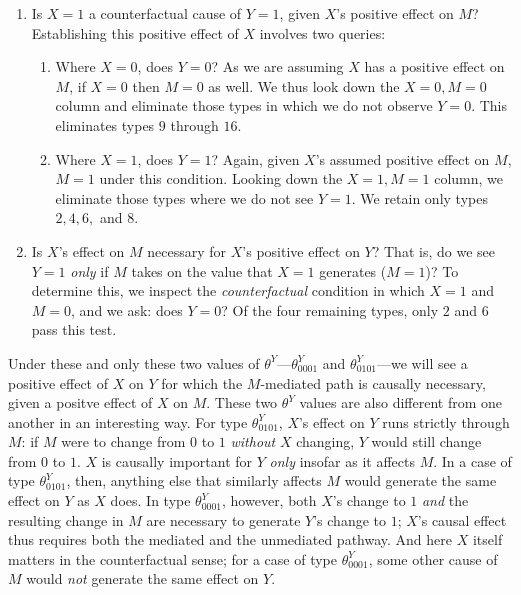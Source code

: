 \documentclass[
  12pt,
]{book}
\begin{document}
\begin{enumerate}
\def\labelenumi{\arabic{enumi}.}
\item
  Is \(X=1\) a counterfactual cause of \(Y=1\), given \(X\)'s positive effect on \(M\)? Establishing this positive effect of \(X\) involves two queries:

  \begin{enumerate}
  \def\labelenumii{\alph{enumii})}
  \item
    Where \(X=0\), does \(Y=0\)? As we are assuming \(X\) has a positive effect on \(M\), if \(X=0\) then \(M=0\) as well. We thus look down the \(X=0, M=0\) column and eliminate those types in which we do not observe \(Y=0\). This eliminates types \(9\) through \(16\).
  \item
    Where \(X=1\), does \(Y=1\)? Again, given \(X\)'s assumed positive effect on \(M\), \(M=1\) under this condition. Looking down the \(X=1, M=1\) column, we eliminate those types where we do not see \(Y=1\). We retain only types \(2, 4, 6,\) and \(8\).
  \end{enumerate}
\item
  Is \(X\)'s effect on \(M\) necessary for \(X\)'s positive effect on \(Y\)? That is, do we see \(Y=1\) \emph{only} if \(M\) takes on the value that \(X=1\) generates (\(M=1\))? To determine this, we inspect the \emph{counterfactual} condition in which \(X=1\) and \(M=0\), and we ask: does \(Y=0\)? Of the four remaining types, only \(2\) and \(6\) pass this test.
\end{enumerate}

Under these and only these two values of \(\theta^Y\)---\(\theta^Y_{0001}\) and \(\theta^Y_{0101}\)---we will see a positive effect of \(X\) on \(Y\) for which the \(M\)-mediated path is causally necessary, given a positve effect of \(X\) on \(M\). These two \(\theta^Y\) values are also different from one another in an interesting way. For type \(\theta^Y_{0101}\), \(X\)'s effect on \(Y\) runs strictly through \(M\): if \(M\) were to change from \(0\) to \(1\) \emph{without} \(X\) changing, \(Y\) would still change from \(0\) to \(1\). \(X\) is causally important for \(Y\) \emph{only} insofar as it affects \(M\). In a case of type \(\theta^Y_{0101}\), then, anything else that similarly affects \(M\) would generate the same effect on \(Y\) as \(X\) does. In type \(\theta^Y_{0001}\), however, both \(X\)'s change to \(1\) \emph{and} the resulting change in \(M\) are necessary to generate \(Y\)'s change to \(1\); \(X\)'s causal effect thus requires both the mediated and the unmediated pathway. And here \(X\) itself matters in the counterfactual sense; for a case of type \(\theta^Y_{0001}\), some other cause of \(M\) would \emph{not} generate the same effect on \(Y\).
\end{document}

